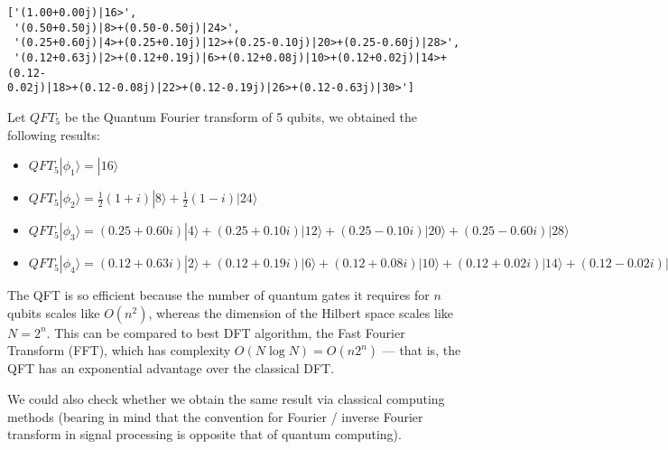 \documentclass[11pt,dvipsnames]{article}
\makeatletter
\newcommand{\boxspacing}{\kern\kvtcb@left@rule\kern\kvtcb@boxsep}
\newcommand{\prompt}[4]{
        {\ttfamily\llap{{\color{#2}[#3]:\hspace{3pt}#4}}\vspace{-\baselineskip}}
    }
\makeatother
\begin{document}
            \begin{tcolorbox}[breakable, size=fbox, boxrule=.5pt, pad at break*=1mm, opacityfill=0]
\prompt{Out}{outcolor}{71}{\boxspacing}
\begin{Verbatim}[commandchars=\\\{\}]
['(1.00+0.00j)|16>',
 '(0.50+0.50j)|8>+(0.50-0.50j)|24>',
 '(0.25+0.60j)|4>+(0.25+0.10j)|12>+(0.25-0.10j)|20>+(0.25-0.60j)|28>',
 '(0.12+0.63j)|2>+(0.12+0.19j)|6>+(0.12+0.08j)|10>+(0.12+0.02j)|14>+(0.12-
0.02j)|18>+(0.12-0.08j)|22>+(0.12-0.19j)|26>+(0.12-0.63j)|30>']
\end{Verbatim}
\end{tcolorbox}
        
    Let \(QFT_5\) be the Quantum Fourier transform of 5 qubits, we obtained
the following results: 

\begin{itemize}
    \item \(QFT_5|\phi_1\rangle = |16⟩\) 
    \item \(QFT_5|\phi_2\rangle = \frac{1}{2}(1+i)|8⟩+\frac{1}{2}(1-i)|24⟩\) 
    \item \(QFT_5|\phi_3\rangle = (0.25+0.60i)|4⟩+(0.25+0.10 i)|12⟩+(0.25-0.10 i) |20⟩ + (0.25-0.60i)|28⟩\)
    \item \(QFT_5|\phi_4\rangle = (0.12+0.63i)|2⟩+(0.12+0.19i)|6⟩+(0.12+0.08i)|10⟩+(0.12+0.02i)|14⟩+(0.12-0.02i)|18⟩+(0.12-0.08i)|22⟩+(0.12-0.19i)|26⟩+(0.12-0.63i)|30⟩\) 
\end{itemize}

The QFT is so efficient because the number of quantum gates it requires
for \(n\) qubits scales like \(O(n^2)\), whereas the dimension of the
Hilbert space scales like \(N=2^n\). This can be compared to best DFT
algorithm, the Fast Fourier Transform (FFT), which has complexity
\(O(N\log N)=O(n2^n)\) --- that is, the QFT has an exponential advantage
over the classical DFT.

We could also check whether we obtain the same result via classical
computing methods (bearing in mind that the convention for Fourier /
inverse Fourier transform in signal processing is opposite that of
quantum computing).
\end{document}

